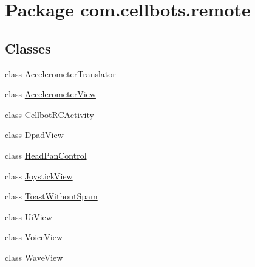 \hypertarget{namespacecom_1_1cellbots_1_1remote}{\section{Package com.\-cellbots.\-remote}
\label{namespacecom_1_1cellbots_1_1remote}
}
\subsection*{Classes}
\begin{DoxyCompactItemize}
\item 
class \hyperlink{classcom_1_1cellbots_1_1remote_1_1_accelerometer_translator}{Accelerometer\-Translator}
\item 
class \hyperlink{classcom_1_1cellbots_1_1remote_1_1_accelerometer_view}{Accelerometer\-View}
\item 
class \hyperlink{classcom_1_1cellbots_1_1remote_1_1_cellbot_r_c_activity}{Cellbot\-R\-C\-Activity}
\item 
class \hyperlink{classcom_1_1cellbots_1_1remote_1_1_dpad_view}{Dpad\-View}
\item 
class \hyperlink{classcom_1_1cellbots_1_1remote_1_1_head_pan_control}{Head\-Pan\-Control}
\item 
class \hyperlink{classcom_1_1cellbots_1_1remote_1_1_joystick_view}{Joystick\-View}
\item 
class \hyperlink{classcom_1_1cellbots_1_1remote_1_1_toast_without_spam}{Toast\-Without\-Spam}
\item 
class \hyperlink{classcom_1_1cellbots_1_1remote_1_1_ui_view}{Ui\-View}
\item 
class \hyperlink{classcom_1_1cellbots_1_1remote_1_1_voice_view}{Voice\-View}
\item 
class \hyperlink{classcom_1_1cellbots_1_1remote_1_1_wave_view}{Wave\-View}
\end{DoxyCompactItemize}
